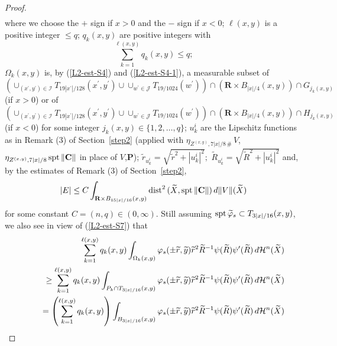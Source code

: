 \documentclass[a4paper,11pt]{amsart}
\begin{document}
\begin{proof}
\begin{eqnarray}
\end{eqnarray}
where we choose the $+$ sign if $x > 0$ and the $-$ sign if $x < 0$; $\ell(x,y)$ is a positive integer $\leq q$; $q_{k}(x,y)$ are positive integers with 
\begin{equation}\label{L2-est-S7}
\sum_{k=1}^{\ell(x,y)} q_{k}(x,y) \leq q;
\end{equation}
$\Omega_{k}(x,y)$ is, by (\ref{L2-est-S4}) and (\ref{L2-est-S4-1}),   a measurable subset of 
$$\left(\cup_{(x^{\prime}, y^{\prime}) \in {\mathcal I}}T_{19|x^{\prime}|/128}(x^{\prime}, y^{\prime}) \cup \cup_{w^{\prime} \in {\mathcal J}}T_{19/1024}(w^{\prime})\right) \cap ({\mathbf R} \times B_{|x|/4}(x,y)) \cap G_{j_{k}(x,y)}$$ 
(if $x >0$) or of  $$\left(\cup_{(x^{\prime}, y^{\prime}) \in {\mathcal I}}T_{19|x^{\prime}|/128}(x^{\prime}, y^{\prime}) \cup \cup_{w^{\prime} \in {\mathcal J}}T_{19/1024}(w^{\prime})\right) \cap({\mathbf R} \times B_{|x|/4}(x,y)) \cap H_{j_{k}(x,y)}$$ (if $x < 0$) for some integer $j_{k}(x,y) \in \{1, 2, \ldots, q\}$; $u_{k}^{i}$ 
are the Lipschitz functions as in Remark (3) of Section~\ref{step2} (applied with $\eta_{Z^{(x, y)}, 7|x|/8 \, \#} \, V$, 
$\eta_{Z^{(x, y)}, 7|x|/8} \,{\rm spt} \,  \|{\mathbf C}\|$ in place of $V$,${\mathbf P}$); 
$\widetilde{r}_{u_{k}^{i}} = \sqrt{\widetilde{r}^{2} + |u_{k}^{i}|^{2}};$ $\widetilde{R}_{u_{k}^{i}} = 
\sqrt{\widetilde{R}^{2} + |u_{k}^{i}|^{2}}$ and, by the estimates of Remark (3) of Section~\ref{step2},  
$$|E| \leq C\int_{{\mathbf R} \times B_{15|x|/16}(x,y)} {\rm dist}^{2} \, (\widetilde{X}, {\rm spt} \, \|{\mathbf C}\|) \, d\|V\|(\widetilde{X})$$
for some constant $C = (n, q) \in (0, \infty)$. Still assuming ${\rm spt} \, \widetilde{\varphi}_{s} \subset T_{3|x|/16}(x,y)$, we also see in view of  (\ref{L2-est-S7}) that 
\begin{eqnarray}\label{L2-est-S7-1}
&&\hspace{-.5in}\sum_{k=1}^{\ell(x,y)}q_{k}(x,y)\int_{\Omega_{k}(x,y)}\varphi_{s}(\pm\widetilde{r},\widetilde{y})\widetilde{r}^{2}\widetilde{R}^{-1}\psi(\widetilde{R})\psi^{\prime}(\widetilde{R}) \, d{\mathcal H}^{n}(\widetilde{X})\nonumber\\
&&\hspace{.2in}\geq\sum_{k=1}^{\ell(x,y)}q_{k}(x,y)\int_{P_{k} \cap T_{3|x|/16}(x,y)}\varphi_{s}(\pm\widetilde{r},\widetilde{y})\widetilde{r}^{2}\widetilde{R}^{-1}\psi(\widetilde{R})\psi^{\prime}(\widetilde{R}) \, d{\mathcal H}^{n}(\widetilde{X})\nonumber\\
&&\hspace{.2in}=\left(\sum_{k=1}^{\ell(x,y)}q_{k}(x,y)\right)\int_{B_{3|x|/16}(x,y)}\varphi_{s}(\pm\widetilde{r},\widetilde{y})\widetilde{r}^{2}\widetilde{R}^{-1}\psi(\widetilde{R})\psi^{\prime}(\widetilde{R}) \, d{\mathcal H}^{n}(\widetilde{X})\nonumber\\

\end{eqnarray}
\end{proof}
\end{document}
